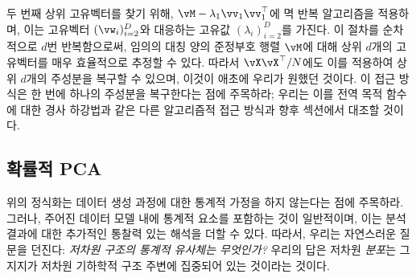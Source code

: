\documentclass[../../book-main_ko.tex]{subfiles}
\begin{document}
두 번째 상위 고유벡터를 찾기 위해, \(\vM - \lambda_{1}\vv_{1}\vv_{1}^{\top}\)에 멱 반복 알고리즘을 적용하며, 이는 고유벡터 \((\vw_{i})_{i = 2}^{D}\)와 대응하는 고유값 \((\lambda_{i})_{i = 2}^{D}\)를 가진다. 이 절차를 순차적으로 \(d\)번 반복함으로써, 임의의 대칭 양의 준정부호 행렬 \(\vM\)에 대해 상위 \(d\)개의 고유벡터를 매우 효율적으로 추정할 수 있다. 따라서 \(\vX\vX^{\top}/N\)에도 이를 적용하여 상위 \(d\)개의 주성분을 복구할 수 있으며, 이것이 애초에 우리가 원했던 것이다. 이 접근 방식은 한 번에 하나의 주성분을 복구한다는 점에 주목하라; 우리는 이를 전역 목적 함수에 대한 경사 하강법과 같은 다른 알고리즘적 접근 방식과 향후 섹션에서 대조할 것이다.





\subsection{확률적 PCA}\label{subsec:probabilistic PCA}

위의 정식화는 데이터 생성 과정에 대한 통계적 가정을 하지 않는다는 점에 주목하라. 그러나, 주어진 데이터 모델 내에 통계적 요소를 포함하는 것이 일반적이며, 이는 분석 결과에 대한 추가적인 통찰력 있는 해석을 더할 수 있다. 따라서, 우리는 자연스러운 질문을 던진다: \textit{저차원 구조의 통계적 유사체는 무엇인가?} 우리의 답은 저차원 \textit{분포}는 그 지지가 저차원 기하학적 구조 주변에 집중되어 있는 것이라는 것이다.
\end{document}
